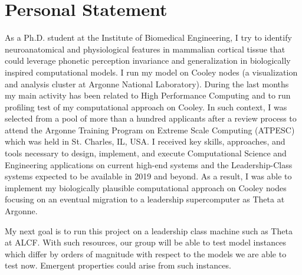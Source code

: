 \documentclass{article}
\begin{document}















\section*{Personal Statement}

As a Ph.D. student at the Institute of Biomedical Engineering, I try to identify neuroanatomical and physiological
features in mammalian cortical tissue that could leverage phonetic perception invariance and generalization in
biologically inspired computational models. I run my model on Cooley nodes (a visualization and analysis cluster
at Argonne National Laboratory). During the last months my main activity has been related to High Performance
Computing and to run profiling test of my computational approach on Cooley.
In such context, I was selected from a pool of more than a hundred
applicants after a review process to attend the Argonne Training Program on Extreme Scale Computing (ATPESC)
which was held in St. Charles, IL, USA. I received key skills, approaches, and tools necessary to design,
implement, and execute Computational Science and Engineering applications on current high-end systems and
the Leadership-Class systems expected to be available in 2019 and beyond. As a result, I was able to implement
my biologically plausible computational approach on Cooley nodes focusing on an eventual migration to a leadership
supercomputer as Theta at Argonne.

My next goal is to run this project on a leadership class machine such as Theta at ALCF. With such resources, our
group will be able to test model instances which differ by orders of magnitude with respect to the models we are able
to test now. Emergent properties could arise from such instances.
\end{document}
